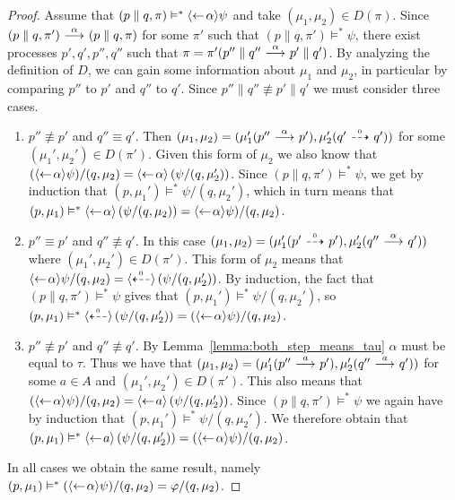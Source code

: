 \begin{proof}

    \ltr Assume that $(p\parallel q, \pi) \vDash^* \mbox{\ensuremath{\langle\leftarrow\! \alpha \rangle}}\psi$ and take
    $(\mu_1,\mu_2)\in D(\pi)$. Since $(p\parallel q, \pi') \ {\stackrel{{\alpha}}{\longrightarrow}}\  (p\parallel
    q, \pi)$ for some $\pi'$ such that $(p\parallel q,\pi') \vDash^* \psi$,
    there exist processes $p',q',p'',q''$ such that $\pi
    = \pi'(p''\parallel q'' \ {\stackrel{{\alpha}}{\longrightarrow}}\  p'\parallel q')$. By analyzing the definition
    of $D$, we can gain some information about $\mu_1$ and $\mu_2$, in particular by
    comparing $p''$ to $p'$ and $q''$ to $q'$. Since $p''\parallel q'' \not\equiv
    p'\parallel q'$ we must consider three cases.
    \begin{enumerate}
        \item $p''\not\equiv p'$ and $q''\equiv q'$. Then $(\mu_1,\mu_2) = (\mu_1'
            (p'' \ {\stackrel{{\alpha}}{\longrightarrow}}\  p'), \mu_2'(q' \ {\stackrel{_{0}}{\dashrightarrow}}\  q'))$ for some $(\mu_1',\mu_2')
            \in D(\pi')$. Given this form of $\mu_2$ we also know that $(\mbox{\ensuremath{\langle\leftarrow\! \alpha \rangle}}
            \psi) / (q,\mu_2) = \mbox{\ensuremath{\langle\leftarrow\! \alpha \rangle}} \left( \psi / (q,\mu_2') \right)$. Since
            $(p\parallel q, \pi') \vDash^* \psi$, we get by induction that $(p,\mu_1')
            \vDash^* \psi / (q,\mu_2')$, which in turn means that $(p,\mu_1)\vDash^*
            \mbox{\ensuremath{\langle\leftarrow\! \alpha \rangle}} \left(\psi / (q,\mu_2)\right) = \mbox{\ensuremath{\langle\leftarrow\! \alpha \rangle}}\psi)/
            (q,\mu_2)$.
        \item $p''\equiv p'$ and $q''\not\equiv q'$. In this case $(\mu_1,\mu_2)
            = (\mu_1'(p'\ {\stackrel{_{0}}{\dashrightarrow}}\ p'), \mu_2'(q''\ {\stackrel{{\alpha}}{\longrightarrow}}\ q'))$ where $(\mu_1',
            \mu_2') \in D(\pi')$. This form of $\mu_2$ means that $\mbox{\ensuremath{\langle\leftarrow\! \alpha \rangle}}
            \psi / (q,\mu_2) = \mbox{\ensuremath{\langle\stackrel{_{0}}{\dashleftarrow}\rangle}} \left( \psi / (q,\mu_2') \right)$.
            By induction, the fact that $(p\parallel q, \pi') \vDash^* \psi$ gives
            that $(p,\mu_1') \vDash^* \psi / (q,\mu_2')$, so $(p,\mu_1) \vDash^*
            \mbox{\ensuremath{\langle\stackrel{_{0}}{\dashleftarrow}\rangle}} \left( \psi / (q,\mu_2') \right) = (\mbox{\ensuremath{\langle\leftarrow\! \alpha \rangle}}\psi)
            / (q,\mu_2)$.
        \item $p''\not\equiv p'$ and $q''\not\equiv q'$. By Lemma~\ref{lemma:both_step_means_tau}
            $\alpha$ must be equal to $\tau$. Thus we have that $(\mu_1,\mu_2) =
            (\mu_1'(p''\ {\stackrel{{a}}{\longrightarrow}}\ p'), \mu_2'(q''\ {\stackrel{{a}}{\longrightarrow}}\ q'))$ for some $a\in A$ and
            $(\mu_1',\mu_2') \in D(\pi')$. This also means that $(\mbox{\ensuremath{\langle\leftarrow\! \alpha \rangle}}\psi)
            / (q,\mu_2) = \mbox{\ensuremath{\langle\leftarrow\! a \rangle}}\left( \psi / (q,\mu_2') \right)$. Since $(p\parallel q,
            \pi') \vDash^* \psi$ we again have by induction that $(p,\mu_1')\vDash^*\psi/(q,
            \mu_2')$. We therefore obtain that $(p,\mu_1) \vDash^* \mbox{\ensuremath{\langle\leftarrow\! a \rangle}}\left(
            \psi / (q,\mu_2') \right) = (\mbox{\ensuremath{\langle\leftarrow\! \alpha \rangle}}\psi) / (q,\mu_2)$.
    \end{enumerate}
    In all cases we obtain the same result, namely $(p,\mu_1) \vDash^* (\mbox{\ensuremath{\langle\leftarrow\! \alpha \rangle}}\psi)
    / (q,\mu_2) = \varphi/(q,\mu_2)$.


\end{proof}
